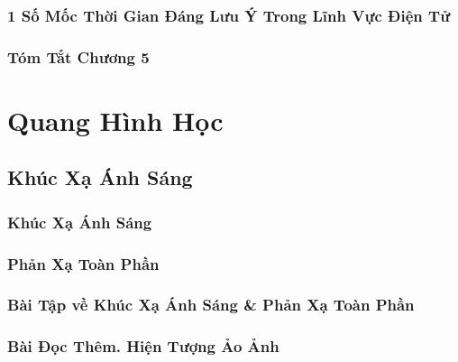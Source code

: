 \documentclass[oneside]{book}
\numberwithin{equation}{section}
\begin{document}

\section{1 Số Mốc Thời Gian Đáng Lưu Ý Trong Lĩnh Vực Điện Tử}


\section{Tóm Tắt Chương 5}


\part{Quang Hình Học}

\chapter{Khúc Xạ Ánh Sáng}

\section{Khúc Xạ Ánh Sáng}


\section{Phản Xạ Toàn Phần}


\section{Bài Tập về Khúc Xạ Ánh Sáng \& Phản Xạ Toàn Phần}


\section{Bài Đọc Thêm. Hiện Tượng Ảo Ảnh}
\end{document}
